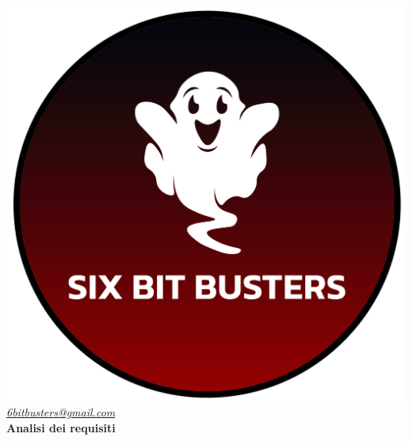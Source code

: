\thispagestyle{empty}
\renewcommand{\arraystretch}{1.3}


\begin{titlepage}
	\begin{center}
		
	\includegraphics[scale = 0.6]{template/images/logo-circle.png}
	\\[0.8cm]
	\href{mailto:6bitbusters@gmail.com}		      	
	{\large{\textit{6bitbusters@gmail.com} } }\\[0.8cm]
	
	\Huge \textbf{Analisi dei requisiti} \\[0.5cm]


\end{center}
\end{titlepage}
